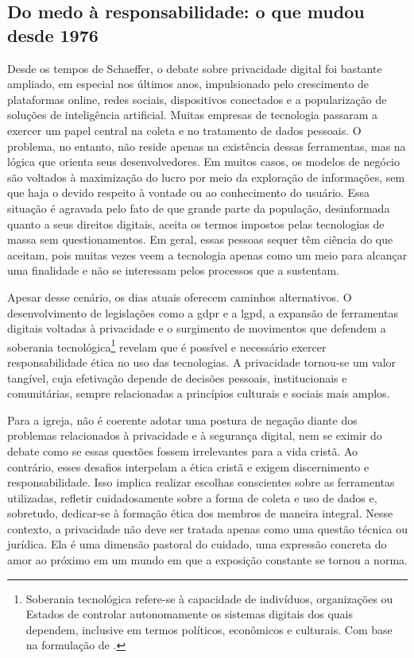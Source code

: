 \subsection{Do medo à responsabilidade: o que mudou desde 1976}

Desde os tempos de Schaeffer, o debate sobre privacidade digital foi bastante ampliado, em especial nos últimos anos, impulsionado pelo crescimento de plataformas online, redes sociais, dispositivos conectados e a popularização de soluções de inteligência artificial. Muitas empresas de tecnologia passaram a exercer um papel central na coleta e no tratamento de dados pessoais. O problema, no entanto, não reside apenas na existência dessas ferramentas, mas na lógica que orienta seus desenvolvedores. Em muitos casos, os modelos de negócio são voltados à maximização do lucro por meio da exploração de informações, sem que haja o devido respeito à vontade ou ao conhecimento do usuário. Essa situação é agravada pelo fato de que grande parte da população, desinformada quanto a seus direitos digitais, aceita os termos impostos pelas tecnologias de massa sem questionamentos. Em geral, essas pessoas sequer têm ciência do que aceitam, pois muitas vezes veem a tecnologia apenas como um meio para alcançar uma finalidade e não se interessam pelos processos que a sustentam.

Apesar desse cenário, os dias atuais oferecem caminhos alternativos. O desenvolvimento de legislações como a \gls{gdpr} e a \gls{lgpd}, a expansão de ferramentas digitais voltadas à privacidade e o surgimento de movimentos que defendem a soberania tecnológica\footnote{Soberania tecnológica refere-se à capacidade de indivíduos, organizações ou Estados de controlar autonomamente os sistemas digitais dos quais dependem, inclusive em termos políticos, econômicos e culturais. Com base na formulação de .} revelam que é possível e necessário exercer responsabilidade ética no uso das tecnologias. A privacidade tornou-se um valor tangível, cuja efetivação depende de decisões pessoais, institucionais e comunitárias, sempre relacionadas a princípios culturais e sociais mais amplos.

Para a igreja, não é coerente adotar uma postura de negação diante dos problemas relacionados à privacidade e à segurança digital, nem se eximir do debate como se essas questões fossem irrelevantes para a vida cristã. Ao contrário, esses desafios interpelam a ética cristã e exigem discernimento e responsabilidade. Isso implica realizar escolhas conscientes sobre as ferramentas utilizadas, refletir cuidadosamente sobre a forma de coleta e uso de dados e, sobretudo, dedicar-se à formação ética dos membros de maneira integral. Nesse contexto, a privacidade não deve ser tratada apenas como uma questão técnica ou jurídica. Ela é uma dimensão pastoral do cuidado, uma expressão concreta do amor ao próximo em um mundo em que a exposição constante se tornou a norma.

